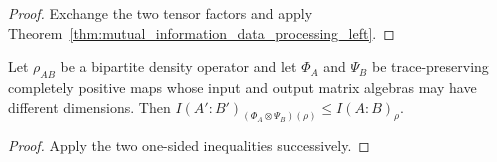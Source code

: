 \begin{proof}\leanok
    Exchange the two tensor factors and apply
    Theorem~\ref{thm:mutual_information_data_processing_left}.
\end{proof}

\begin{theorem}
    \label{thm:mutual_information_data_processing}
    \leanok
    Let $\rho_{AB}$ be a bipartite density operator and let $\Phi_A$ and
    $\Psi_B$ be trace-preserving completely positive maps whose input and
    output matrix algebras may have different dimensions. Then
    $I(A':B')_{(\Phi_A\otimes\Psi_B)(\rho)}\leq I(A:B)_\rho$.
\end{theorem}

\begin{proof}\leanok
    Apply the two one-sided inequalities successively.
\end{proof}
